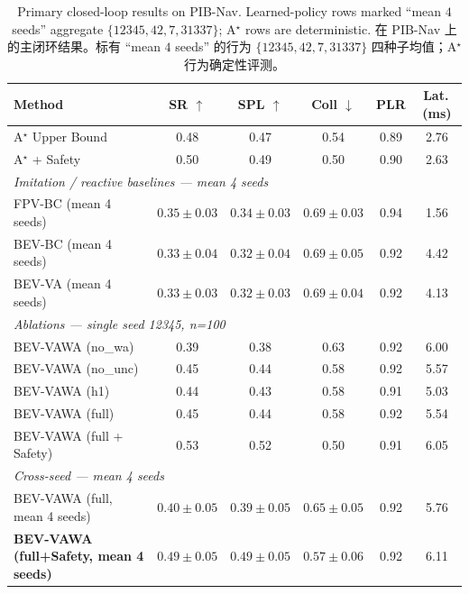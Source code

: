 \documentclass[11pt,a4paper]{article}
\begin{document}
\begin{table}[H]
\centering\small
\caption{Primary closed-loop results on PIB-Nav. Learned-policy rows marked
``mean $4$ seeds'' aggregate $\{12345,42,7,31337\}$; A$^\star$ rows are
deterministic. \textsf{\small 在 PIB-Nav 上的主闭环结果。标有
``mean $4$ seeds'' 的行为 $\{12345,42,7,31337\}$ 四种子均值；A$^\star$
行为确定性评测。}}
\label{tab:main}
\begin{tabular}{lccccc}
\toprule
Method & SR $\uparrow$ & SPL $\uparrow$ & Coll $\downarrow$ & PLR & Lat.\,(ms) \\
\midrule
A$^\star$ Upper Bound          & 0.48 & 0.47 & 0.54 & 0.89 & 2.76 \\
A$^\star$ + Safety             & 0.50 & 0.49 & 0.50 & 0.90 & 2.63 \\
\midrule
\multicolumn{6}{l}{\emph{Imitation / reactive baselines — mean 4 seeds}} \\
FPV-BC (mean 4 seeds)          & $0.35\pm 0.03$ & $0.34\pm 0.03$ & $0.69\pm 0.03$ & 0.94 & 1.56 \\
BEV-BC (mean 4 seeds)          & $0.33\pm 0.04$ & $0.32\pm 0.04$ & $0.69\pm 0.05$ & 0.92 & 4.42 \\
BEV-VA (mean 4 seeds)          & $0.33\pm 0.03$ & $0.32\pm 0.03$ & $0.69\pm 0.04$ & 0.92 & 4.13 \\
\midrule
\multicolumn{6}{l}{\emph{Ablations — single seed 12345, n=100}} \\
BEV-VAWA (no\_wa)              & 0.39 & 0.38 & 0.63 & 0.92 & 6.00 \\
BEV-VAWA (no\_unc)             & 0.45 & 0.44 & 0.58 & 0.92 & 5.57 \\
BEV-VAWA (h1)                  & 0.44 & 0.43 & 0.58 & 0.91 & 5.03 \\
BEV-VAWA (full)                & 0.45 & 0.44 & 0.58 & 0.92 & 5.54 \\
BEV-VAWA (full + Safety)       & 0.53 & 0.52 & 0.50 & 0.91 & 6.05 \\
\midrule
\multicolumn{6}{l}{\emph{Cross-seed — mean 4 seeds}} \\
BEV-VAWA (full, mean 4 seeds)            & $0.40\pm 0.05$ & $0.39\pm 0.05$ & $0.65\pm 0.05$ & 0.92 & 5.76 \\
\textbf{BEV-VAWA (full+Safety, mean 4 seeds)} & $\mathbf{0.49\pm 0.05}$ & $\mathbf{0.49\pm 0.05}$ & $\mathbf{0.57\pm 0.06}$ & 0.92 & 6.11 \\
\bottomrule
\end{tabular}
\end{table}
\end{document}
